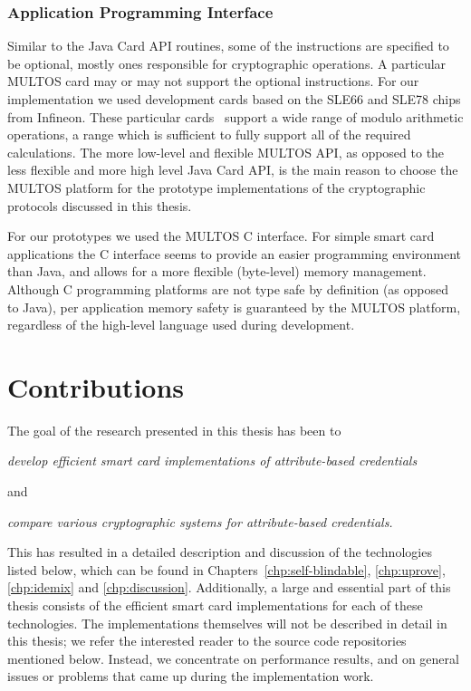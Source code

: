 \subsubsection{Application Programming Interface}

Similar to the Java Card API routines, some of the
instructions are specified to be optional, mostly ones responsible for
cryptographic operations. A particular MULTOS card may or may not support the
optional instructions. For our implementation we used development cards based on
the SLE66 and SLE78 chips from Infineon. These particular
cards~\cite{MIR2012} support a wide range of modulo arithmetic
operations, a range which is sufficient to fully support all of the required
calculations. The more low-level and flexible MULTOS API, as
opposed to the less flexible and more high level Java Card API, is the main 
reason to choose the MULTOS platform for the prototype implementations of the
cryptographic protocols discussed in this thesis.

For our prototypes we used the MULTOS C interface. For simple smart card
applications the C interface seems to provide an easier programming environment
than Java, and allows for a more flexible (byte-level) memory management.
Although C programming platforms are not type safe by definition (as opposed to
Java), per application memory safety is guaranteed by the MULTOS platform,
regardless of the high-level language used during development.


\section{Contributions}

The goal of the research presented in this thesis has been to
\begin{center}\it
  develop efficient smart card implementations of attribute-based credentials
\end{center}
and
\begin{center}\it
  compare various cryptographic systems for attribute-based credentials.
\end{center}
This has resulted in a detailed description and discussion of the technologies
listed below, which can be found in Chapters~\ref{chp:self-blindable},
\ref{chp:uprove}, \ref{chp:idemix} and \ref{chp:discussion}. Additionally, a
large and essential part of this thesis consists of the efficient smart card
implementations for each of these technologies. The implementations themselves
will not be described in detail in this thesis; we refer the interested reader
to the source code repositories mentioned below. Instead, we concentrate on
performance results, and on general issues or problems that came up during the
implementation work.

